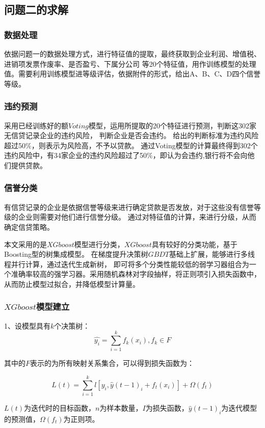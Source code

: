 \documentclass[UTF8]{ctexart}
\begin{document}
\subsection{问题二的求解}
\subsubsection{数据处理}
依据问题一的数据处理方式，进行特征值的提取，最终获取到企业利润、增值税、进销项发票作废率、是否盈亏、下属分公司
等20个特征值，用作训练模型的处理值。需要利用训练模型进等级评估，依据附件的形式，给出A、B、C、D四个信誉等级。
\subsubsection{违约预测}
采用已经训练好的额$Voting$模型，运用所提取的20个特征进行预测，判断这302家无信贷记录企业的违约风险，
判断企业是否会违约。 给出的判断标准为违约风险超过50$\%$，则表示为风险高，不予以贷款。
通过Voting模型的计算最终得到302个违约风险中，有34家企业的违约风险超过了50$\%$，即认为会违约,银行将不会向他们提供贷款。
\subsubsection{信誉分类}
有信贷记录的企业是依据信誉等级来进行确定贷款是否发放，对于这些没有信誉等级的企业则需要对他们进行信誉分级。
通过对特征值的计算，来进行分级，从而确定信贷策略。

本文采用的是$XGboost$模型进行分类，$XGboost$具有较好的分类功能，基于Boosting型的树集成模型。
在梯度提升决策树$GBDT$基础上扩展，能够进行多线程并行计算，通过迭代生成新树，
即可将多个分类性能较低的弱学习器组合为一个准确率较高的强学习器。采用随机森林对字段抽样，将正则项引入损失函数中，
从而防止模型过拟合，并降低模型计算量。

\subsubsection{$XGboost$模型建立}
1、设模型具有$k$个决策树：
\begin{equation}
	\hat{y_i}=\sum_{i = 1}^{k}f_k(x_i),f_k \in F
\end{equation}

其中的$F$表示的为所有映射关系集合，可以得到损失函数为：

\begin{equation}
	L(t)=\sum_{i = 1}^{k}l[y_i,\hat{y}(t-1)_i+f_t(x_i)]+\Omega (f_t)
\end{equation}

$L(t)$为迭代时的目标函数，$n$为样本数量，$I$为损失函数，$\hat{y}(t-1)_i$为迭代模型的预测值，$\Omega (f_t)$为正则项。
\end{document}
